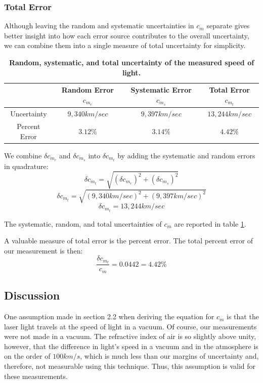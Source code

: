 \documentclass[twocolumn]{article}
\begin{document}
		
		\subsubsection{Total Error} \label{subsubsec:TotalError}
		Although leaving the random and systematic uncertainties in $c_m$ separate gives better insight into how each error source contributes to the overall uncertainty, we can combine them into a single measure of total uncertainty for simplicity.
		
		\begin{table}[!ht]
			\centering
			\begin{tabular}{c|c c c}
				&	Random Error $c_{m_r}$	& Systematic Error $c_{m_s}$	& Total Error $c_{m_t}$	\\ \hline
				Uncertainty	&	$9,340 km/sec$	& $9,397 km/sec$	&	$13,244 km/sec$	\\
				Percent Error	&	$3.12\%$	&	$3.14\%$	&	$4.42\%$	\\
			\end{tabular}
			\caption{\textbf{Random, systematic, and total uncertainty of the measured speed of light.}}
			\label{tab:Uncertainties}
		\end{table}
		
		We combine $\delta c_{m_r}$ and $\delta c_{m_s}$ into $\delta c_{m_t}$ by adding the systematic and random errors in quadrature:
		\begin{equation}
			\delta c_{m_t} = \sqrt{ \left(\delta c_{m_r} \right)^2 + \left( \delta c_{m_s} \right)^2}
		\end{equation}
		\begin{equation}
		\delta c_{m_t} = \sqrt{ \left( 9,340 km/sec \right)^2 + \left(  9,397 km/sec \right)^2}
		\end{equation}
		\begin{equation}
			\delta c_{m_t} = 13,244 km/sec
		\end{equation}
		
		The systematic, random, and total uncertainties of $c_m$ are reported in table \ref{tab:Uncertainties}.
		
		A valuable measure of total error is the percent error.
		The total percent error of our measurement is then:
		\begin{equation}
			\frac{\delta c_{m_t}}{c_m} = 0.0442 = 4.42\% 
		\end{equation}
		
	\subsection{Discussion}
		One assumption made in section 2.2 when deriving the equation for $c_m$ is that the laser light travels at the speed of light in a vacuum. 
		Of course, our measurements were not made in a vacuum.
		The refractive index of air is so slightly above unity, however, that the difference in light's speed in a vacuum and in the atmosphere is on the order of $100 km/s$, which is much less than our margins of uncertainty and, therefore, not measurable using this technique.
		Thus, this assumption is valid for these measurements.
		
\end{document}
